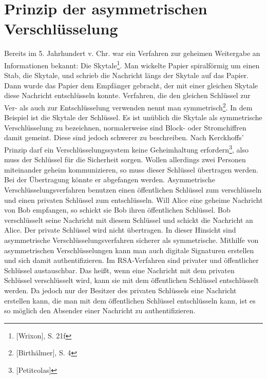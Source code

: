 \section{Prinzip der asymmetrischen Verschlüsselung}
Bereits im 5. Jahrhundert v. Chr. war ein Verfahren zur geheimen Weitergabe an Informationen bekannt: Die Skytale\footnote{[Wrixon], S. 21f}. Man wickelte Papier spiralförmig um einen Stab, die Skytale,  und schrieb die Nachricht längs der Skytale auf das Papier. Dann wurde das Papier dem Empfänger gebracht, der mit einer gleichen Skytale diese Nachricht entschlüsseln konnte.	 
Verfahren, die den gleichen Schlüssel zur Ver- als auch zur Entschlüsselung verwenden nennt man symmetrisch\footnote{[Birthälmer], S. 4}. In dem Beispiel ist die Skytale der Schlüssel. Es ist unüblich die Skytale als symmetrische Verschlüsselung zu bezeichnen, normalerweise sind Block- oder Stromchiffren damit gemeint. Diese sind jedoch schwerer zu beschreiben.
Nach Kerckhoffs' Prinzip darf ein Verschlüsselungssystem keine Geheimhaltung erfordern\footnote{[Petitcolas]}, also muss der Schlüssel für die Sicherheit sorgen. Wollen allerdings zwei Personen miteinander geheim kommunizieren, so muss dieser Schlüssel übertragen werden. Bei der Übertragung könnte er abgefangen werden.
Asymmetrische Verschlüsselungsverfahren benutzen einen öffentlichen Schlüssel zum verschlüsseln und einen privaten Schlüssel zum entschlüsseln. Will Alice eine geheime Nachricht von Bob empfangen, so schickt sie Bob ihren öffentlichen Schlüssel. Bob verschlüsselt seine Nachricht mit diesem Schlüssel und schickt die Nachricht an Alice. Der private Schlüssel wird nicht übertragen. In dieser Hinsicht sind asymmetrische Verschlüsselungsverfahren sicherer als symmetrische.
Mithilfe von asymmetrischen Verschlüsselungen kann man auch digitale Signaturen erstellen und sich damit authentifizieren. Im RSA-Verfahren sind privater und öffentlicher Schlüssel austauschbar. Das heißt, wenn eine Nachricht mit dem privaten Schlüssel verschlüsselt wird, kann sie mit dem öffentlichen Schlüssel entschlüsselt werden. Da jedoch nur der Besitzer des privaten Schlüssels eine Nachricht erstellen kann, die man mit dem öffentlichen Schlüssel entschlüsseln kann, ist es so möglich den Absender einer Nachricht zu authentifizieren.

